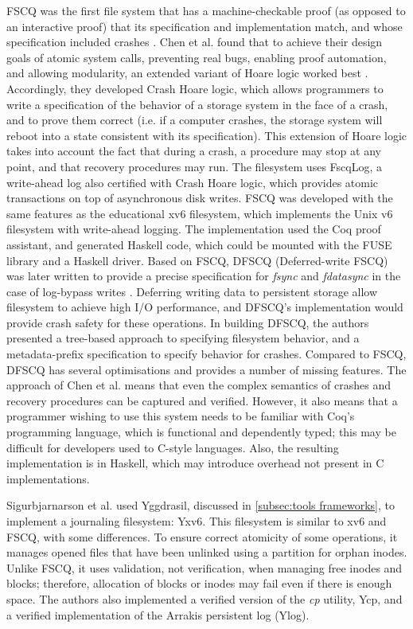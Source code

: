 FSCQ was the first file system that has a machine-checkable proof (as opposed to an interactive proof) that its specification and implementation match, and whose specification included crashes \cite{chen2015specifying}.
Chen et al. found that to achieve their design goals of atomic system calls, preventing real bugs, enabling proof automation, and allowing modularity, an extended variant of Hoare logic worked best \cite{chen2015using}.
Accordingly, they developed Crash Hoare logic, which allows programmers to write a specification of the behavior of a storage system in the face of a crash, and to prove them correct (i.e. if a computer crashes, the storage system will reboot into a state consistent with its specification).
This extension of Hoare logic takes into account the fact that during a crash, a procedure may stop at any point, and that recovery procedures may run.
The filesystem uses FscqLog, a write-ahead log also certified with Crash Hoare logic, which provides atomic transactions on top of asynchronous disk writes.
FSCQ was developed with the same features as the educational xv6 filesystem, which implements the Unix v6 filesystem with write-ahead logging.
The implementation used the Coq proof assistant, and generated Haskell code, which could be mounted with the FUSE library and a Haskell driver.
Based on FSCQ, DFSCQ (Deferred-write FSCQ) was later written to provide a precise specification for \textit{fsync} and \textit{fdatasync} in the case of log-bypass writes \cite{chen2017}.
Deferring writing data to persistent storage allow filesystem to achieve high I/O performance, and DFSCQ's implementation would provide crash safety for these operations.
In building DFSCQ, the authors presented a tree-based approach to specifying filesystem behavior, and a metadata-prefix specification to specify behavior for crashes.
Compared to FSCQ, DFSCQ has several optimisations and provides a number of missing features.
The approach of Chen et al. means that even the complex semantics of crashes and recovery procedures can be captured and verified.
However, it also means that a programmer wishing to use this system needs to be familiar with Coq's programming language, which is functional and dependently typed; this may be difficult for developers used to C-style languages.
Also, the resulting implementation is in Haskell, which may introduce overhead not present in C implementations.

Sigurbjarnarson et al. used Yggdrasil, discussed in \autoref{subsec:tools frameworks}, to implement a journaling filesystem: Yxv6.
This filesystem is similar to xv6 and FSCQ, with some differences.
To ensure correct atomicity of some operations, it manages opened files that have been unlinked using a partition for orphan inodes.
Unlike FSCQ, it uses validation, not verification, when managing free inodes and blocks; therefore, allocation of blocks or inodes may fail even if there is enough space.
The authors also implemented a verified version of the \textit{cp} utility, Ycp, and a verified implementation of the Arrakis \cite{peter2014} persistent log (Ylog).
